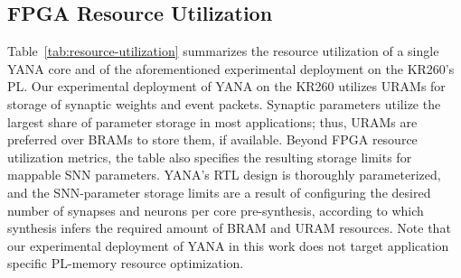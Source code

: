 \subsection{FPGA Resource Utilization}
Table~\ref{tab:resource-utilization} summarizes the resource utilization of a single YANA core and of the aforementioned experimental deployment on the KR260's \ac{PL}.
Our experimental deployment of YANA on the KR260 utilizes URAMs for storage of synaptic weights and event packets.
Synaptic parameters utilize the largest share of parameter storage in most applications; thus, URAMs are preferred over BRAMs to store them, if available.
Beyond FPGA resource utilization metrics, the table also specifies the resulting storage limits for mappable SNN parameters. YANA's \ac{RTL} design is thoroughly parameterized, and the \ac{SNN}-parameter storage limits are a result of configuring the desired number of synapses and neurons per core pre-synthesis, according to which synthesis infers the required amount of BRAM and URAM resources. Note that our experimental deployment of YANA in this work does not target application specific \ac{PL}-memory resource optimization. 
\begin{table}
    \centering
\end{table}